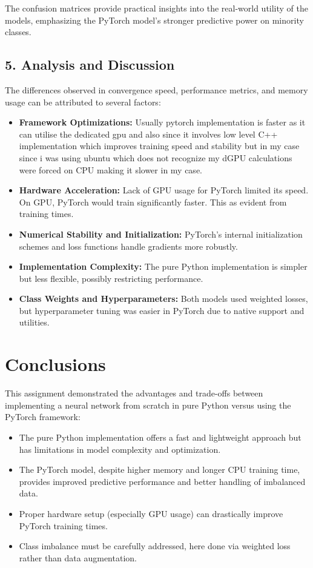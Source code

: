 \documentclass[12pt]{article}
\begin{document}
The confusion matrices provide practical insights into the real-world utility of the models, emphasizing the PyTorch model’s stronger predictive power on minority classes.

\subsection{5. Analysis and Discussion}
The differences observed in convergence speed, performance metrics, and memory usage can be attributed to several factors:

\begin{itemize}
    \item \textbf{Framework Optimizations:} Usually pytorch implementation is faster as it can utilise the dedicated gpu and also since it involves low level C++ implementation which improves training speed and stability but in my case since i was using ubuntu which does not recognize my dGPU calculations were forced on CPU making it slower in my case.
    \item \textbf{Hardware Acceleration:} Lack of GPU usage for PyTorch limited its speed. On GPU, PyTorch would train significantly faster. This as evident from training times.
    \item \textbf{Numerical Stability and Initialization:} PyTorch’s internal initialization schemes and loss functions handle gradients more robustly.
    \item \textbf{Implementation Complexity:} The pure Python implementation is simpler but less flexible, possibly restricting performance.
    \item \textbf{Class Weights and Hyperparameters:} Both models used weighted losses, but hyperparameter tuning was easier in PyTorch due to native support and utilities.
\end{itemize}

\newpage

\section*{Conclusions}

This assignment demonstrated the advantages and trade-offs between implementing a neural network from scratch in pure Python versus using the PyTorch framework:

\begin{itemize}
    \item The pure Python implementation offers a fast and lightweight approach but has limitations in model complexity and optimization.
    \item The PyTorch model, despite higher memory and longer CPU training time, provides improved predictive performance and better handling of imbalanced data.
    \item Proper hardware setup (especially GPU usage) can drastically improve PyTorch training times.
    \item Class imbalance must be carefully addressed, here done via weighted loss rather than data augmentation.
\end{itemize}
\end{document}

